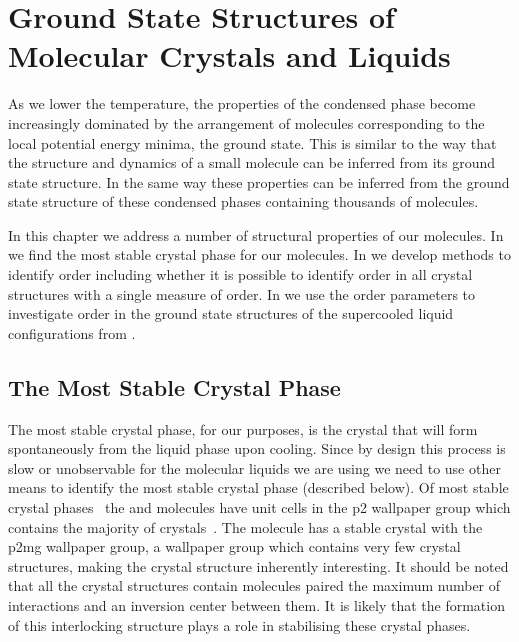 \chapter[Strucuture of Crystals and Liquids]{Ground State Structures of Molecular Crystals and Liquids}
\label{sec:structure}

As we lower the temperature, the properties of the condensed phase become increasingly dominated by the arrangement of molecules corresponding to the local potential energy minima, the ground state. This is similar to the way that the structure and dynamics of a small molecule can be inferred from its ground state structure. In the same way these properties can be inferred from the ground state structure of these condensed phases containing thousands of molecules.

In this chapter we address a number of structural properties of our molecules. In  we find the most stable crystal phase for our molecules. In  we develop methods to identify order including whether it is possible to identify order in all crystal structures with a single measure of order. In  we use the order parameters to investigate order in the ground state structures of the supercooled liquid configurations from .

\section{The Most Stable Crystal Phase}

The most stable crystal phase, for our purposes, is the crystal that will form spontaneously from the liquid phase upon cooling. Since by design this process is slow or unobservable for the molecular liquids we are using we need to use other means to identify the most stable crystal phase (described below). Of most stable crystal phases~ the \dcon and \tri molecules have unit cells in the p2 wallpaper group  which contains the majority of crystals~\cite{plass:07,jennings:15}. The \done molecule has a stable crystal with the p2mg wallpaper group, a wallpaper group which contains very few crystal structures, making the crystal structure inherently interesting. It should be noted that all the crystal structures contain molecules paired the maximum number of interactions and an inversion center between them. It is likely that the formation of this interlocking structure plays a role in stabilising these crystal phases.


